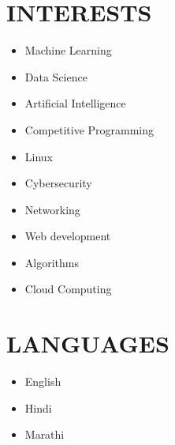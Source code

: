 \documentclass[letterpaper,11pt]{article}
\begin{document}
\section{INTERESTS}
\begin{multicols}{2}

\begin{itemize}
\item Machine Learning
\item Data Science
\item Artificial Intelligence
\item Competitive Programming
\item Linux
\end{itemize}
\vfill
\columnbreak
\begin{itemize}
\item Cybersecurity
\item Networking
\item Web development
\item Algorithms
\item Cloud Computing
\end{itemize}
\vfill
\end{multicols}
\section{LANGUAGES}
\begin{multicols}{3}
\begin{itemize}
\item English
\end{itemize}
\vfill\null
\columnbreak
\begin{itemize}
\item Hindi
\end{itemize}
\vfill\null
\columnbreak
\begin{itemize}
\item Marathi
\end{itemize}

\end{multicols}
\end{document}
